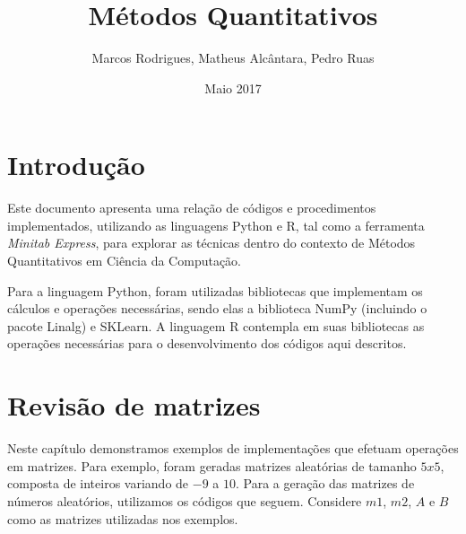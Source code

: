 \documentclass{article}
\title{Métodos Quantitativos}
\author{Marcos Rodrigues, Matheus Alcântara, Pedro Ruas}
\date{Maio 2017}
\begin{document}
\maketitle

\section{Introdução}

Este documento apresenta uma relação de códigos e procedimentos implementados, utilizando as linguagens Python e R, tal como a ferramenta \emph{Minitab Express}, para explorar as técnicas dentro do contexto de Métodos Quantitativos em Ciência da Computação.

Para a linguagem Python, foram utilizadas bibliotecas que implementam os cálculos e operações necessárias, sendo elas a biblioteca NumPy (incluindo o pacote Linalg) e SKLearn.
A linguagem R contempla em suas bibliotecas as operações necessárias para o desenvolvimento dos códigos aqui descritos.


\section{Revisão de matrizes}

Neste capítulo demonstramos exemplos de implementações que efetuam operações em matrizes. Para exemplo, foram geradas matrizes aleatórias de tamanho $5x5$, composta de inteiros variando de $-9$ a $10$. Para a geração das matrizes de números aleatórios, utilizamos os códigos que seguem. Considere $m1$, $m2$, $A$ e $B$ como as matrizes utilizadas nos exemplos.
\end{document}
